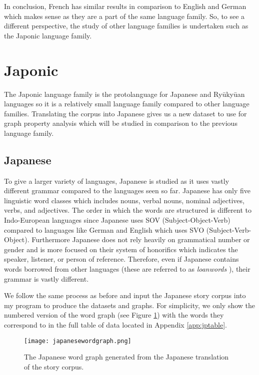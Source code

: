 In conclusion, French has similar results in comparison to English and German which makes sense as they are a part of the same language family. So, to see a different perspective, the study of other language families is undertaken such as the Japonic language family.

\section{Japonic}
The Japonic language family is the protolanguage for Japanese and Ryūkyūan languages \cite{vovin2017origins} so it is a relatively small language family compared to other language families. Translating the corpus into Japanese gives us a new dataset to use for graph property analysis which will be studied in comparison to the previous language family.
\subsection{Japanese}
To give a larger variety of languages, Japanese is studied as it uses vastly different grammar compared to the languages seen so far. Japanese has only five linguistic word classes which includes nouns, verbal nouns, nominal adjectives, verbs, and adjectives. The order in which the words are structured is different to Indo-European languages since Japanese uses SOV (Subject-Object-Verb) compared to languages like German and English which uses SVO (Subject-Verb-Object). Furthermore Japanese does not rely heavily on grammatical number or gender and is more focused on their system of honorifics which indicates the speaker, listener, or person of reference. Therefore, even if Japanese contains words borrowed from other languages (these are referred to as \emph{loanwords} \cite{miura1979influence}), their grammar is vastly different. 

We follow the same process as before and input the Japanese story corpus into my program to produce the datasets and graphs. For simplicity, we only show the numbered version of the word graph (see Figure \ref{fig:jpgraph}) with the words they correspond to in the full table of data located in Appendix \ref{app:jptable}.

\begin{figure}[!htb]
\centering
\texttt{[image: japanesewordgraph.png]}
\caption{The Japanese word graph generated from the Japanese translation of the story corpus.}
\label{fig:jpgraph}
\end{figure}

